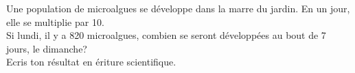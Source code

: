 %
%
Une population de microalgues se développe dans la marre du jardin. En un jour, elle se multiplie par 10.\\
	Si lundi, il y a 820 microalgues, combien se seront développées au bout de 7 jours, le dimanche? \\
	Ecris ton résultat en ériture scientifique.
